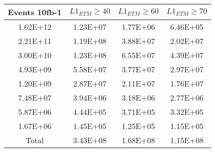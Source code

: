\begin{tabular}{|c|c|c|c|}
\hline
Events 10fb-1 & $L1_{ETM}\geq40$ & $L1_{ETM}\geq60$ & $L1_{ETM}\geq70$ \\
\hline\hline
\num{1.62E+12} & \num{1.23E+07} & \num{1.77E+06} & \num{6.46E+05} \\ 
\num{2.21E+11} & \num{1.19E+08} & \num{3.88E+07} & \num{2.02E+07} \\ 
\num{3.00E+10} & \num{1.23E+08} & \num{6.55E+07} & \num{4.39E+07} \\ 
\num{4.93E+09} & \num{5.58E+07} & \num{3.77E+07} & \num{2.97E+07} \\ 
\num{1.20E+09} & \num{2.87E+07} & \num{2.11E+07} & \num{1.76E+07} \\ 
\num{7.48E+07} & \num{3.94E+06} & \num{3.18E+06} & \num{2.77E+06} \\ 
\num{5.87E+06} & \num{4.44E+05} & \num{3.71E+05} & \num{3.32E+05} \\ 
\num{1.67E+06} & \num{1.45E+05} & \num{1.25E+05} & \num{1.15E+05} \\ 
\hline \hline
Total & \num{3.43E+08} & \num{1.68E+08} & \num{1.15E+08} \\ 
\hline
\end{tabular}








